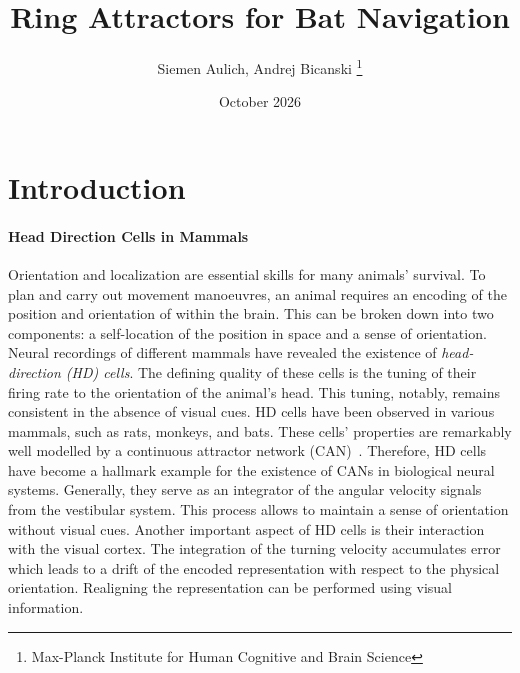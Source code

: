 \documentclass[a4paper,11pt,leqno]{article}
\begin{document}
\title{Ring Attractors for Bat Navigation}

\author{Siemen Aulich, Andrej Bicanski
\thanks{Max-Planck Institute for Human Cognitive and Brain Science}}

\date{October 2026}   


\begin{titlepage}
\maketitle
\end{titlepage}

\section{Introduction}\label{s:introduction}

\paragraph{Head Direction Cells in Mammals}
Orientation and localization are essential skills for many animals' survival. To plan and carry out movement manoeuvres, an animal requires an encoding of the position and orientation of within the brain. This can be broken down into two components: a self-location of the position in space and a sense of orientation.
Neural recordings of different mammals have revealed the existence of \textit{head-direction (HD) cells}. The defining quality of these cells is the tuning of their firing rate to the orientation of the animal's head. This tuning, notably, remains consistent in the absence of visual cues. HD cells have been observed in various mammals, such as rats, monkeys, and bats.  %
These cells' properties are remarkably well modelled by a continuous attractor network (CAN)~\cite{Zhang1996}. Therefore, HD cells have become a hallmark example for the existence of CANs in biological neural systems. Generally, they serve as an integrator of the angular velocity signals from the vestibular system. This process allows to maintain a sense of orientation without visual cues. 
Another important aspect of HD cells is their interaction with the visual cortex. The integration of the turning velocity accumulates error which leads to a drift of the encoded representation with respect to the physical orientation. Realigning the representation can be performed using visual information.
\end{document}
